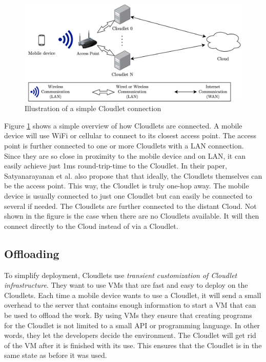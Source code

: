 \begin{figure}[t]
    \centering
    \includegraphics[scale=0.9]{chapters/4_architectures/figures/Cloudlet.png}
    \caption{Illustration of a simple Cloudlet connection}
    \label{fig:Cloudlet}
\end{figure}


Figure \ref{fig:Cloudlet} shows a simple overview of how Cloudlets are connected. A mobile device will use WiFi or cellular to connect to its closest access point. The access point is further connected to one or more Cloudlets with a LAN connection. Since they are so close in proximity to the mobile device and on LAN, it can easily achieve just 1ms round-trip-time to the Cloudlet. In their paper, Satyanarayanan et al.\cite{satyanarayanan_case_2009} also propose that that ideally, the Cloudlets themselves can be the access point. This way, the Cloudlet is truly one-hop away. The mobile device is usually connected to just one Cloudlet but can easily be connected to several if needed. The Cloudlets are further connected to the distant Cloud. Not shown in the figure is the case when there are no Cloudlets available. It will then connect directly to the Cloud instead of via a Cloudlet. 


\subsection{Offloading}
To simplify deployment, Cloudlets use \textit{transient customization of Cloudlet infrastructure}. They want to use VMs that are fast and easy to deploy on the Cloudlets. Each time a mobile device wants to use a Cloudlet, it will send a small overhead to the server that contains enough information to start a VM that can be used to offload the work. By using VMs they ensure that creating programs for the Cloudlet is not limited to a small API or programming language. In other words, they let the developers decide the environment. The Cloudlet will get rid of the VM after it is finished with its use. This ensures that the Cloudlet is in the same state as before it was used.



